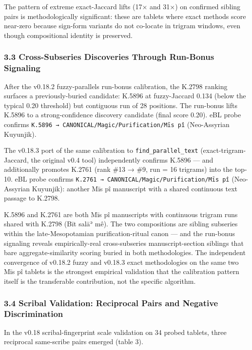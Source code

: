 \documentclass[
  11pt,
  letterpaper,
]{article}
\begin{document}
The pattern of extreme exact-Jaccard lifts (17× and 31×) on confirmed
sibling pairs is methodologically significant: these are tablets where
exact methods score near-zero because sign-form variants do not
co-locate in trigram windows, even though compositional identity is
preserved.

\subsubsection{3.3 Cross-Subseries Discoveries Through Run-Bonus
Signaling}\label{cross-subseries-discoveries-through-run-bonus-signaling}

After the v0.18.2 fuzzy-parallels run-bonus calibration, the K.2798
ranking surfaces a previously-buried candidate: K.5896 at fuzzy-Jaccard
0.134 (below the typical 0.20 threshold) but contiguous run of 28
positions. The run-bonus lifts K.5896 to a strong-confidence discovery
candidate (final score 0.20). eBL probe confirms
\texttt{K.5896\ →\ CANONICAL/Magic/Purification/Mīs\ pî} (Neo-Assyrian
Kuyunjik).

The v0.18.3 port of the same calibration to
\texttt{find\_parallel\_text} (exact-trigram-Jaccard, the original v0.4
tool) independently confirms K.5896 --- and additionally promotes K.2761
(rank \#13 → \#9, run = 16 trigrams) into the top-10. eBL probe confirms
\texttt{K.2761\ →\ CANONICAL/Magic/Purification/Mīs\ pî} (Neo-Assyrian
Kuyunjik): another Mīs pî manuscript with a shared continuous text
passage to K.2798.

K.5896 and K.2761 are both Mīs pî manuscripts with continuous trigram
runs shared with K.2798 (Bīt salāʾ mê). The two compositions are sibling
subseries within the late-Mesopotamian purification-ritual canon --- and
the run-bonus signaling reveals empirically-real cross-subseries
manuscript-section siblings that bare aggregate-similarity scoring
buried in both methodologies. The independent convergence of v0.18.2
fuzzy and v0.18.3 exact methodologies on the same two Mīs pî tablets is
the strongest empirical validation that the calibration pattern itself
is the transferable contribution, not the specific algorithm.

\subsubsection{3.4 Scribal Validation: Reciprocal Pairs and Negative
Discrimination}\label{scribal-validation-reciprocal-pairs-and-negative-discrimination}

In the v0.18 scribal-fingerprint scale validation on 34 probed tablets,
three reciprocal same-scribe pairs emerged (table 3).
\end{document}
